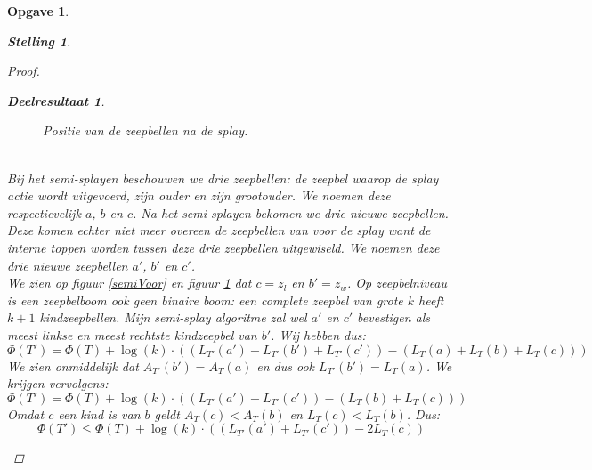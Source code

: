 \documentclass[12pt,hidelinks]{article}
\newtheorem{opgave}{Opgave}
\newtheorem{stelling}{Stelling}
\newtheorem{deelresultaat}{Deelresultaat}
\newcommand{\newln}{~\\\vspace{0.5em}}
\begin{document}
\begin{opgave}
\begin{description}
\begin{stelling}
\begin{proof}
\begin{deelresultaat}
\begin{figure}[H]
                            \caption{Positie van de zeepbellen na de splay.}
                            \label{semiNa}
                        \end{figure}
                        \newln
                        Bij het semi-splayen beschouwen we drie zeepbellen: de zeepbel waarop de splay actie wordt uitgevoerd, zijn ouder en zijn grootouder. 
                        We noemen deze respectievelijk $a$, $b$ en $c$.
                        Na het semi-splayen bekomen we drie nieuwe zeepbellen.
                        Deze komen echter niet meer overeen de zeepbellen van voor de splay want de interne toppen worden tussen deze drie zeepbellen uitgewiseld.
                        We noemen deze drie nieuwe zeepbellen $a'$, $b'$ en $c'$.
                        \newln
                        We zien op figuur \ref{semiVoor} en figuur \ref{semiNa} dat $c = z_l$ en $b' = z_w$.
                        Op zeepbelniveau is een zeepbelboom ook geen binaire boom: een complete zeepbel van grote $k$ heeft $k+1$ kindzeepbellen.
                        Mijn semi-splay algoritme zal wel $a'$ en $c'$ bevestigen als meest linkse en meest rechtste kindzeepbel van $b'$.
                        Wij hebben dus:
                        $$\Phi(T') = \Phi(T) + \log(k)\cdot ((L_{T'}(a')+L_{T'}(b')+L_{T'}(c')) - (L_T(a)+L_T(b)+L_T(c)))$$
                        We zien onmiddelijk dat $A_{T'}(b')=A_T(a)$ en dus ook $L_{T'}(b')=L_T(a)$. We krijgen vervolgens:
                        $$\Phi(T') = \Phi(T) + \log(k)\cdot((L_{T'}(a')+L_{T'}(c')) - (L_T(b)+L_T(c)))$$
                        Omdat $c$ een kind is van $b$ geldt $A_T(c) < A_T(b)$ en $L_T(c) < L_T(b)$.
                        Dus:
                        $$\Phi(T') \le \Phi(T) +\log(k)\cdot((L_{T'}(a')+L_{T'}(c')) - 2L_T(c))$$

\end{deelresultaat}
\end{proof}
\end{stelling}
\end{description}
\end{opgave}
\end{document}
